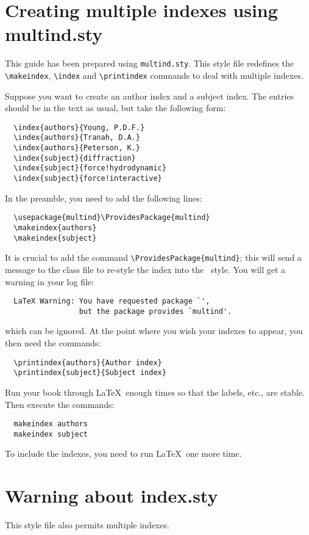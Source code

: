 \section{Creating multiple indexes using multind.sty}
This guide has been prepared using \verb"multind.sty".
This style file redefines the \verb"\makeindex", \verb"\index" and
\verb"\printindex" commands to deal with multiple indexes.

Suppose you want to create an author index and a subject index.
The entries should be in the text as usual, but take the following form:
\begin{verbatim}
  \index{authors}{Young, P.D.F.}
  \index{authors}{Tranah, D.A.}
  \index{authors}{Peterson, K.}
  \index{subject}{diffraction}
  \index{subject}{force!hydrodynamic}
  \index{subject}{force!interactive}
\end{verbatim}
In the preamble, you need to add the following lines:
\begin{verbatim}
  \usepackage{multind}\ProvidesPackage{multind}
  \makeindex{authors}
  \makeindex{subject}
\end{verbatim}
It is crucial to add the command \verb"\ProvidesPackage{multind}";
this will send a message to the class file to re-style the index into
the \cambridge\ style. You will get a warning in your log file:
\begin{verbatim}
  LaTeX Warning: You have requested package `',
                 but the package provides `multind'.
\end{verbatim}
which can be ignored. At the point where you wish your indexes to appear, you then need the commands:
\begin{verbatim}
  \printindex{authors}{Author index}
  \printindex{subject}{Subject index}
\end{verbatim}
Run your book through \LaTeX\ enough times so that the labels, etc., are stable. Then execute the commands:
\begin{verbatim}
  makeindex authors
  makeindex subject
\end{verbatim}
To include the indexes, you need to run \LaTeX\ one more time.

\section{Warning about index.sty}
This style file also permits multiple indexes.

